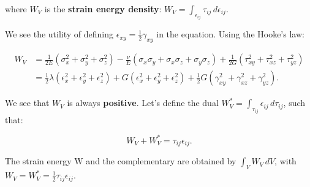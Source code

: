 	where $W_V$ is the \textbf{strain energy density}:
	$W_V = \int _{\epsilon _{ij}} \tau _{ij} \, d\epsilon _{ij}.$
	
	We see the utility of defining $\epsilon _{xy} = \frac{1}{2} \gamma _{xy}$ in the equation. Using the Hooke's law:
	
	\begin{equation}
	\begin{aligned}
	W_V &= \frac{1}{2E}(\sigma _x ^2 + \sigma _y ^2 +\sigma _z ^2) - \frac{\nu }{E} ( \sigma _x\sigma _y + \sigma _x\sigma _z + \sigma _y \sigma _z) + \frac{1}{2G} (\tau _{xy}^2+\tau _{xz}^2+\tau _{yz}^2)\\
	&= \frac{1}{2}\lambda (\epsilon _x ^2+\epsilon _y ^2+\epsilon _z ^2) + G(\epsilon _x ^2+\epsilon _y ^2+\epsilon _z ^2) + \frac{1}{2} G (\gamma _{xy}^2 +\gamma _{xz}^2 + \gamma _{yz}^2).
	\end{aligned}
	\end{equation}
	
	We see that $W_V$ is always \textbf{positive}. Let's define the dual $W_V^* = \int _{\tau _{ij}} \epsilon _{ij} \, d\tau _{ij}$, such that:
	
	\begin{equation}
	W_V + W_V^* = \tau _{ij} \epsilon _{ij}.
	\end{equation}
	
	The strain energy W and the complementary are obtained by $\int _V W_V\, dV$, with $W_V = W_V^* = \frac{1}{2}\tau _{ij}\epsilon _{ij}$.